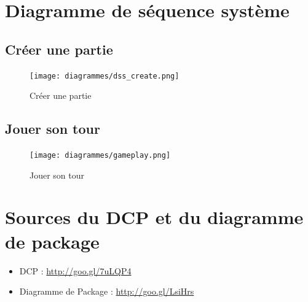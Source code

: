 \section{Diagramme de séquence système}
	\subsection{Créer une partie}
		\vspace{10mm}
		\begin{figure}[!h]
			\centering
			\texttt{[image: diagrammes/dss\_create.png]}
			\caption{Créer une partie}
		\end{figure}


	\subsection{Jouer son tour}
		\vspace{10mm}
		\begin{figure}[!h]
			\centering
			\texttt{[image: diagrammes/gameplay.png]}
			\caption{Jouer son tour}
		\end{figure}
		\vspace{70mm}

\section{Sources du DCP et du diagramme de package}
	\begin{itemize}
		\item DCP : \url{http://goo.gl/7uLQP4}
		\item Diagramme de Package : \url{http://goo.gl/LsiHrs}
	\end{itemize}
